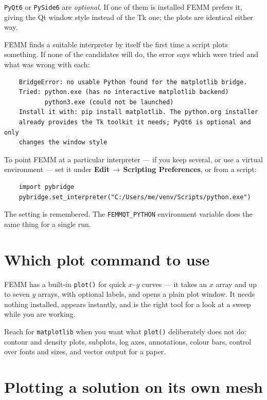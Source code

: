 {\tt PyQt6} or {\tt PySide6} are {\em optional}.  If one of them is installed
FEMM prefers it, giving the Qt window style instead of the Tk one; the plots
are identical either way.

FEMM finds a suitable interpreter by itself the first time a script plots
something.  If none of the candidates will do, the error says which were tried
and what was wrong with each:

\begin{verbatim}
    BridgeError: no usable Python found for the matplotlib bridge.
    Tried: python.exe (has no interactive matplotlib backend)
           python3.exe (could not be launched)
    Install it with: pip install matplotlib. The python.org installer
    already provides the Tk toolkit it needs; PyQt6 is optional and only
    changes the window style
\end{verbatim}

To point FEMM at a particular interpreter --- if you keep several, or use a
virtual environment --- set it under {\bf Edit\,$\rightarrow$\,Scripting
Preferences}, or from a script:

\begin{verbatim}
    import pybridge
    pybridge.set_interpreter("C:/Users/me/venv/Scripts/python.exe")
\end{verbatim}

The setting is remembered.  The {\tt FEMMQT\_PYTHON} environment variable does
the same thing for a single run.

\section{Which plot command to use}

FEMM has a built-in {\tt plot()} for quick $x$--$y$ curves --- it takes an
$x$ array and up to seven $y$ arrays, with optional labels, and opens a plain
plot window.  It needs nothing installed, appears instantly, and is the right
tool for a look at a sweep while you are working.

Reach for {\tt matplotlib} when you want what {\tt plot()} deliberately does
not do: contour and density plots, subplots, log axes, annotations, colour
bars, control over fonts and sizes, and vector output for a paper.

\section{Plotting a solution on its own mesh}

